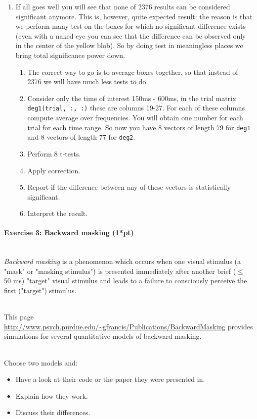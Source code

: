 \documentclass[a4paper,11pt]{article}
\newenvironment{exercise}[3]{\paragraph{Exercise #1: #2 (#3pt)}\ \\}{
\medskip}
\begin{document}
\begin{enumerate}
\begin{enumerate}
		\item We will use False discovery rate. There is, again, Matlab function \texttt{mafdr}\footnote{\url{http://www.mathworks.se/help/bioinfo/ref/mafdr.html}}, which can be used as easily as \texttt{corrected\_p\_values = mafdr(p\_values)}
		\item Perform False discovery rate on your vector of 2376 p-value and see if any of them will survive (pass the significance criterium check: corrected p-value $\leqslant \alpha$)
	\end{enumerate}
	\item If all goes well you will see that none of 2376 results can be considered significant anymore. This is, however, quite expected result: the reason is that we perform many test on the boxes for which no significant difference exists (even with a naked eye you can see that the difference can be observed only in the center of the yellow blob). So by doing test in meaningless places we bring total significance power down.
	\begin{enumerate}
		\item The correct way to go is to average boxes together, so that instead of 2376 we will have much less tests to do.
		\item Consider only the time of interest 150ms - 600ms, in the trial matrix \texttt{deg1(trial, :, :)} these are columns 19-27. For each of these columns compute average over frequencies. You will obtain one number for each trial for each time range. So now you have 8 vectors of length 79 for \texttt{deg1}  and 8 vectors of length 77 for \texttt{deg2}.
		\item Perform 8 t-tests.
		\item Apply correction.
		\item Report if the difference between any of these vectors is statistically significant.
		\item Interpret the result.
	\end{enumerate}
\end{enumerate}


%
%
\begin{exercise}{3}{Backward masking}{1*}
\emph{Backward masking} is a phenomenon which occurs when one visual stimulus (a "mask" or "masking stimulus") is presented immediately after another brief ($\leqslant$ 50 ms) "target" visual stimulus and leads to a failure to consciously perceive the first ("target") stimulus.

\ \\
This page \url{http://www.psych.purdue.edu/~gfrancis/Publications/BackwardMasking} provides simulations for several quantitative models of backward masking.

\ \\
Choose two models and:
\begin{itemize}
	\item Have a look at their code or the paper they were presented in.
	\item Explain how they work.
	\item Discuss their differences.
\end{itemize}

\end{exercise}
\end{document}

